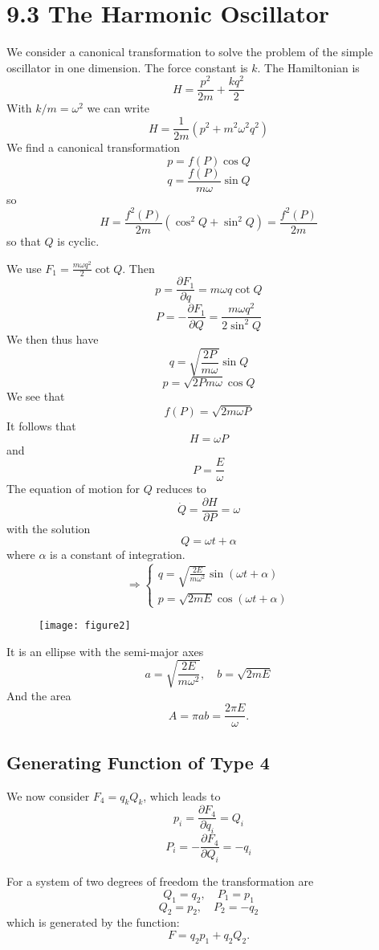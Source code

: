 \documentclass[12pt]{article}
\begin{document}
	\section*{9.3 The Harmonic Oscillator}
	
	We consider a canonical transformation to solve the problem of the simple oscillator in one dimension. The force constant is $k$. The Hamiltonian is
	\[ H = \frac{p^2}{2m} + \frac{kq^2}{2} \]
	With $k/m = \omega^2$ we can write
	\[ H = \frac{1}{2m}(p^2 + m^2\omega^2q^2) \]
	We find a canonical transformation
	\[ p = f(P)\cos{Q} \]
	\[ q = \frac{f(P)}{m\omega}\sin{Q} \]
	so
	\[ H = \frac{f^2(P)}{2m}(\cos^2{Q} + \sin^2{Q}) = \frac{f^2(P)}{2m} \]
	so that $Q$ is cyclic.
	
	We use $F_1 = \frac{m\omega q^2}{2} \cot{Q}$.
	Then
	\[ p = \frac{\partial F_1}{\partial q} = m\omega q \cot{Q} \]
	\[ P = -\frac{\partial F_1}{\partial Q} = \frac{m\omega q^2}{2\sin^2{Q}} \]
	We then thus have
	\[ q = \sqrt{\frac{2P}{m\omega}}\sin{Q} \]
	\[ p = \sqrt{2Pm\omega}\cos{Q} \]
	We see that
	\[ f(P) = \sqrt{2m\omega P} \]
	It follows that
	\[ H = \omega P \]
	and
	\[ P = \frac{E}{\omega} \]
	The equation of motion for $Q$ reduces to
	\[ \dot{Q} = \frac{\partial H}{\partial P} = \omega \]
	with the solution
	\[ Q = \omega t + \alpha \]
	where $\alpha$ is a constant of integration.
	\[ \Rightarrow \begin{cases} q = \sqrt{\frac{2E}{m\omega^2}}\sin(\omega t + \alpha) \\ p = \sqrt{2mE}\cos(\omega t + \alpha) \end{cases} \]
	
	\begin{figure}[h]
		\centering
		\texttt{[image: figure2]}
		\caption{}
		\label{fig:figure2}
	\end{figure}
	
	It is an ellipse with the semi-major axes
	\[ a = \sqrt{\frac{2E}{m\omega^2}}, \quad b = \sqrt{2mE} \]
	And the area
	\[ A = \pi ab = \frac{2\pi E}{\omega}. \]
	
	\subsection*{Generating Function of Type 4}
	We now consider $F_4 = q_k Q_k$, which leads to
	\[ p_i = \frac{\partial F_4}{\partial q_i} = Q_i \]
	\[ P_i = -\frac{\partial F_4}{\partial Q_i} = -q_i \]
	
	For a system of two degrees of freedom the transformation are
	\[ Q_1 = q_2, \quad P_1 = p_1 \]
	\[ Q_2 = p_2, \quad P_2 = -q_2 \]
	which is generated by the function:
	\[ F = q_2 p_1 + q_2 Q_2. \]
	
\end{document}
